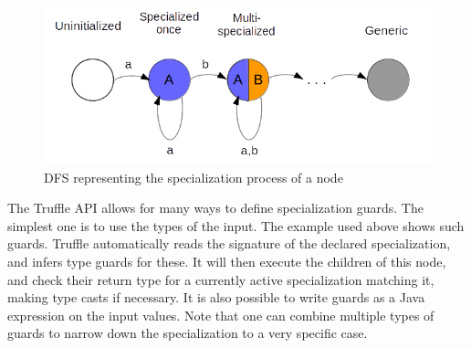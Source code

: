 \documentclass[twoside,11pt,a4paper]{article}
\begin{document}
\begin{figure}[th]
	\centering
	\includegraphics[width=12cm]{./graphs/SpecializationDFS.png}
	\caption{DFS representing the specialization process of a node}
	\label{fig:specdfs}
\end{figure}

The Truffle API allows for many ways to define specialization guards. The simplest one is to use the types of the input. The example used above shows such guards. Truffle automatically reads the signature of the declared specialization, and infers type guards for these. It will then execute the children of this node, and check their return type for a currently active specialization matching it, making type casts if necessary. It is also possible to write guards as a Java expression on the input values. Note that one can combine multiple types of guards to narrow down the specialization to a very specific case.
\end{document}
